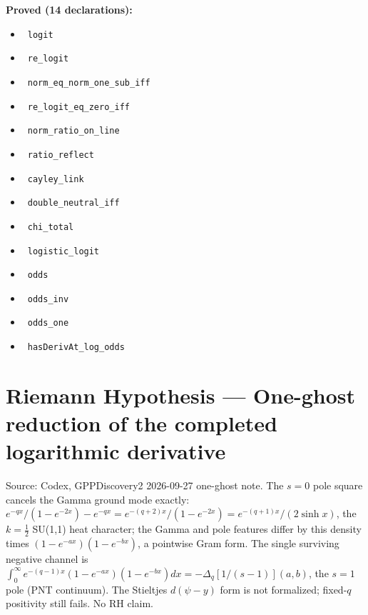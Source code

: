 \documentclass{report}
\theoremstyle{definition}
\begin{document}
\noindent\textbf{Proved (14 declarations):}
\begin{itemize}
  \item {}\leanok\ \texttt{logit}
  \item {}\leanok\ \texttt{re\_logit}
  \item {}\leanok\ \texttt{norm\_eq\_norm\_one\_sub\_iff}
  \item {}\leanok\ \texttt{re\_logit\_eq\_zero\_iff}
  \item {}\leanok\ \texttt{norm\_ratio\_on\_line}
  \item {}\leanok\ \texttt{ratio\_reflect}
  \item {}\leanok\ \texttt{cayley\_link}
  \item {}\leanok\ \texttt{double\_neutral\_iff}
  \item {}\leanok\ \texttt{chi\_total}
  \item {}\leanok\ \texttt{logistic\_logit}
  \item {}\leanok\ \texttt{odds}
  \item {}\leanok\ \texttt{odds\_inv}
  \item {}\leanok\ \texttt{odds\_one}
  \item {}\leanok\ \texttt{hasDerivAt\_log\_odds}
\end{itemize}

\section{Riemann Hypothesis --- One-ghost reduction of the completed logarithmic derivative}
Source: Codex, GPPDiscovery2 2026-09-27 one-ghost note. The $s=0$ pole square cancels the Gamma ground mode exactly: $e^{-qx}/(1-e^{-2x})-e^{-qx}=e^{-(q+2)x}/(1-e^{-2x})=e^{-(q+1)x}/(2\sinh x)$, the $k=\tfrac12$ SU(1,1) heat character; the Gamma and pole features differ by this density times $(1-e^{-ax})(1-e^{-bx})$, a pointwise Gram form. The single surviving negative channel is $\int_0^\infty e^{-(q-1)x}(1-e^{-ax})(1-e^{-bx})dx=-\Delta_q[1/(s-1)](a,b)$, the $s=1$ pole (PNT continuum). The Stieltjes $d(\psi-y)$ form is not formalized; fixed-$q$ positivity still fails. No RH claim.
\end{document}
